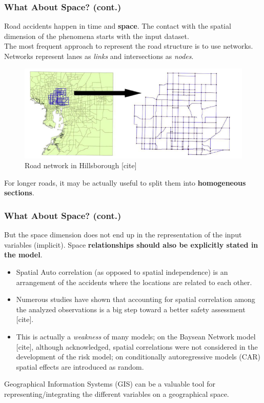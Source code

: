 \documentclass[hyperref={pdfpagelabels=true}]{beamer}
\begin{document}
\begin{frame}
\frametitle{What About Space? (cont.)}
Road accidents happen in time and \textbf{space}. The contact with the spatial dimension of the phenomena starts with the input dataset.\\
The most frequent approach to represent the road structure is to use networks. Networks represent lanes as \textit{links} and intersections as \textit{nodes}.
\begin{figure}
\includegraphics[scale=0.40]{road_network.png}
\caption{\tiny{Road network in  Hillsborough [cite]}}
\end{figure}
For longer roads, it may be actually useful to split them into \textbf{homogeneous sections}. %
\end{frame}

\begin{frame}
\frametitle{What About Space? (cont.)}
But the space dimension does not end up in the representation of the input variables (implicit). Space \textbf{relationships should also be explicitly stated in the model}.
\begin{itemize}
\item Spatial Auto correlation (as opposed to spatial independence) is an arrangement of the accidents where the locations are related to each other.
\item Numerous studies have shown that accounting for spatial correlation among the analyzed observations is a big step toward a better safety assessment [cite].
\item This is actually a \textit{weakness} of many models; on the Baysean Network model [cite], although acknowledged, spatial correlations were not considered in the development of the risk model; on conditionally autoregressive models (CAR) spatial effects are introduced as random.
\end{itemize}
Geographical Information Systems (GIS) can be a valuable tool for representing/integrating the different variables on a geographical space.
\end{frame}
\end{document}
